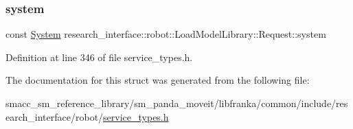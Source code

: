 \subsubsection{\texorpdfstring{system}{system}}
{\footnotesize\ttfamily const \hyperlink{structresearch__interface_1_1robot_1_1LoadModelLibrary_a64b0f0f01e8f2716ef4c2478037559eb}{System} research\+\_\+interface\+::robot\+::\+Load\+Model\+Library\+::\+Request\+::system}



Definition at line 346 of file service\+\_\+types.\+h.



The documentation for this struct was generated from the following file\+:\begin{DoxyCompactItemize}
\item 
smacc\+\_\+sm\+\_\+reference\+\_\+library/sm\+\_\+panda\+\_\+moveit/libfranka/common/include/research\+\_\+interface/robot/\hyperlink{service__types_8h}{service\+\_\+types.\+h}\end{DoxyCompactItemize}
